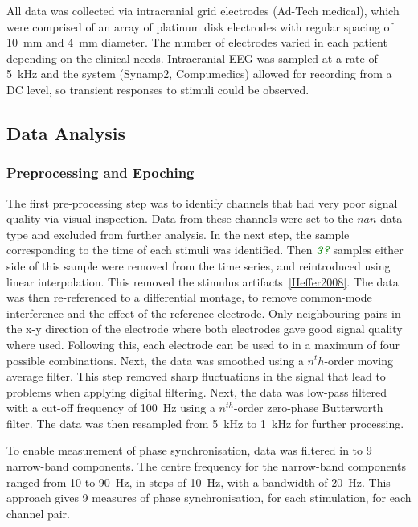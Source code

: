 \documentclass[]{article}
\newcommand{\dean}[1]{\textsf{\emph{\textbf{\textcolor{green}{#1}}}}}
\begin{document}
All data was collected via intracranial grid electrodes (Ad-Tech medical), which were comprised of an array of platinum disk electrodes with regular spacing of 10~mm and 4~mm diameter. The number of electrodes varied in each patient depending on the clinical needs. Intracranial EEG was sampled at a rate of 5~kHz and the system (Synamp2, Compumedics) allowed for recording from a DC level, so transient responses to stimuli could be observed.

\subsection{Data Analysis}
\subsubsection{Preprocessing and Epoching}
The first pre-processing step was to identify channels that had very poor signal quality via visual inspection. Data from these channels were set to the $nan$ data type and excluded from further analysis. In the next step, the sample corresponding to the time of each stimuli was identified. Then \dean{3?} samples either side of this sample were removed from the time series, and reintroduced using linear interpolation. This removed the stimulus artifacts~\ref{Heffer2008}. The data was then re-referenced to a differential montage, to remove common-mode interference and the effect of the reference electrode. Only neighbouring pairs in the x-y direction of the electrode where both electrodes gave good signal quality where used. Following this, each electrode can be used to in a maximum of four possible combinations. Next, the data was smoothed using a $n^th$-order moving average filter. This step removed sharp fluctuations in the signal that lead to problems when applying digital filtering. Next, the data was low-pass filtered with a cut-off frequency of 100~Hz using a $n^{th}$-order zero-phase Butterworth filter. The data was then resampled from 5~kHz to 1~kHz for further processing.

To enable measurement of phase synchronisation, data was filtered in to 9 narrow-band components. The centre frequency for the narrow-band components ranged from 10 to 90~Hz, in steps of 10~Hz, with a bandwidth of 20~Hz. This approach gives 9 measures of phase synchronisation, for each stimulation, for each channel pair.
\end{document}
